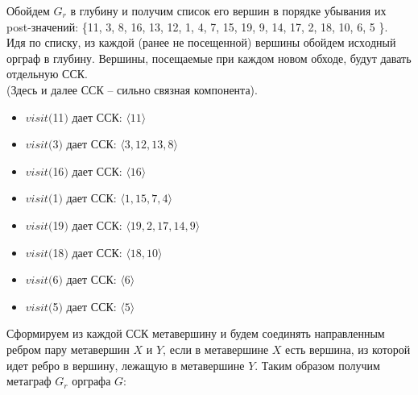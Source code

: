\documentclass{article}
\begin{document}
 Обойдем $G_r$ в глубину и получим список его вершин в порядке убывания их post-значений: \{11, 3, 8, 16, 13, 12, 1, 4, 7, 15, 19, 9, 14, 17, 2, 18, 10, 6, 5 \}.\\Идя по списку, из каждой (ранее не посещенной) вершины обойдем $исходный$ орграф в глубину.
Вершины, посещаемые при каждом новом обходе, будут давать отдельную ССК.
\\(Здесь и далее ССК – сильно связная компонента).\\
\begin{itemize}
\item $visit($11$)$ дает ССК: $\langle 11 \rangle$\item $visit($3$)$ дает ССК: $\langle 3, 12, 13, 8 \rangle$\item $visit($16$)$ дает ССК: $\langle 16 \rangle$\item $visit($1$)$ дает ССК: $\langle 1, 15, 7, 4 \rangle$\item $visit($19$)$ дает ССК: $\langle 19, 2, 17, 14, 9 \rangle$\item $visit($18$)$ дает ССК: $\langle 18, 10 \rangle$\item $visit($6$)$ дает ССК: $\langle 6 \rangle$\item $visit($5$)$ дает ССК: $\langle 5 \rangle$
\end{itemize}

Сформируем из каждой ССК метавершину и будем соединять направленным ребром пару метавершин $X$ и $Y$,
если в метавершине $X$ есть вершина, из которой идет ребро в вершину, лежащую в метавершине $Y$.
Таким образом получим метаграф $G_r$ орграфа $G$:\\\\
\end{document}
